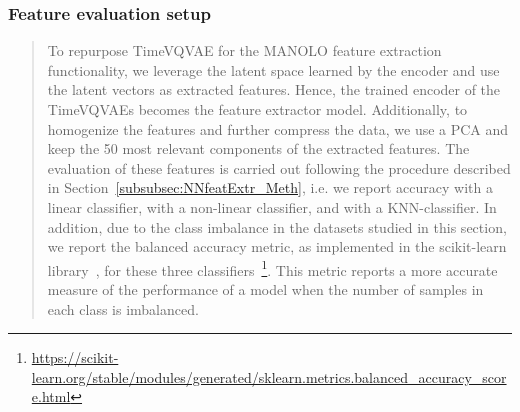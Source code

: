 \subsubsection*{Feature evaluation setup}  
\begin{quote}
To repurpose TimeVQVAE for the MANOLO feature extraction functionality, we leverage the latent space learned by the encoder and use the latent vectors as extracted features. Hence, the trained encoder of the TimeVQVAEs becomes the feature extractor model. Additionally, to homogenize the features and further compress the data, we use a PCA and keep the 50 most relevant components of the extracted features. The evaluation of these features is carried out following the procedure described in Section~\ref{subsubsec:NNfeatExtr_Meth}, i.e. we report accuracy with a linear classifier, with a non-linear classifier, and with a KNN-classifier. In addition, due to the class imbalance in the datasets studied in this section, we report the balanced accuracy metric, as implemented in the scikit-learn library~\cite{scikit-learn}, for these three classifiers~\footnote{\url{https://scikit-learn.org/stable/modules/generated/sklearn.metrics.balanced_accuracy_score.html}}. This metric reports a more accurate measure of the performance of a model when the number of samples in each class is imbalanced.  
\end{quote}

